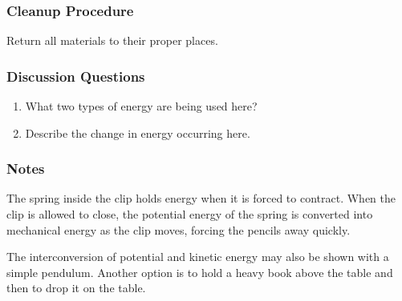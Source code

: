 \subsubsection*{Cleanup Procedure}
Return all materials to their proper places.

\subsubsection*{Discussion Questions}
\begin{enumerate}
\item{What two types of energy are being used here?}
\item{Describe the change in energy occurring here.}
\end{enumerate}
 
\subsubsection{Notes}
The spring inside the clip holds energy when it is forced to contract.  
When the clip is allowed to close, the potential energy of the spring
is converted into mechanical energy as the clip moves, forcing the pencils
away quickly.

The interconversion of potential and kinetic energy may also be shown with a simple pendulum. Another option is to hold a heavy book above the table and then to drop it on the table.

